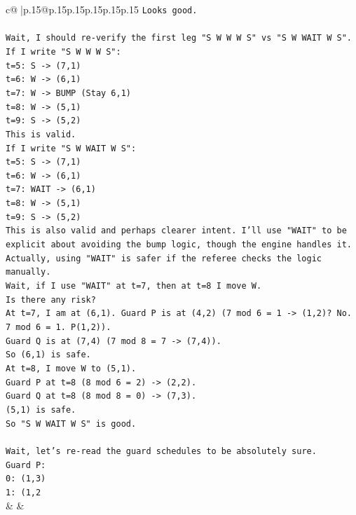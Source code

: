 \documentclass{article}
\begin{document}
{\begin{supertabular}{c@{$\;$}|p{.15\linewidth}@{}p{.15\linewidth}p{.15\linewidth}p{.15\linewidth}p{.15\linewidth}p{.15\linewidth}}
{{{\texttt{Looks good.} \\
\\ 
\texttt{Wait, I should re{-}verify the first leg "S W W W S" vs "S W WAIT W S".} \\
\texttt{If I write "S W W W S":} \\
\texttt{t=5: S {-}> (7,1)} \\
\texttt{t=6: W {-}> (6,1)} \\
\texttt{t=7: W {-}> BUMP (Stay 6,1)} \\
\texttt{t=8: W {-}> (5,1)} \\
\texttt{t=9: S {-}> (5,2)} \\
\texttt{This is valid.} \\
\texttt{If I write "S W WAIT W S":} \\
\texttt{t=5: S {-}> (7,1)} \\
\texttt{t=6: W {-}> (6,1)} \\
\texttt{t=7: WAIT {-}> (6,1)} \\
\texttt{t=8: W {-}> (5,1)} \\
\texttt{t=9: S {-}> (5,2)} \\
\texttt{This is also valid and perhaps clearer intent. I'll use "WAIT" to be explicit about avoiding the bump logic, though the engine handles it. Actually, using "WAIT" is safer if the referee checks the logic manually.} \\
\texttt{Wait, if I use "WAIT" at t=7, then at t=8 I move W.} \\
\texttt{Is there any risk?} \\
\texttt{At t=7, I am at (6,1). Guard P is at (4,2) (7 mod 6 = 1 {-}> (1,2)? No. 7 mod 6 = 1. P(1,2)).} \\
\texttt{Guard Q is at (7,4) (7 mod 8 = 7 {-}> (7,4)).} \\
\texttt{So (6,1) is safe.} \\
\texttt{At t=8, I move W to (5,1).} \\
\texttt{Guard P at t=8 (8 mod 6 = 2) {-}> (2,2).} \\
\texttt{Guard Q at t=8 (8 mod 8 = 0) {-}> (7,3).} \\
\texttt{(5,1) is safe.} \\
\texttt{So "S W WAIT W S" is good.} \\
\\ 
\texttt{Wait, let's re{-}read the guard schedules to be absolutely sure.} \\
\texttt{Guard P:} \\
\texttt{0: (1,3)} \\
\texttt{1: (1,2} \\
            }
        }
    }
    & & \\ \\


\end{supertabular}}
\end{document}
